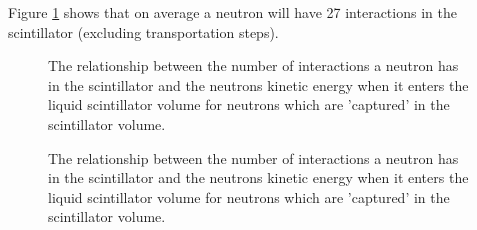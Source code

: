 \par
Figure \ref{fig:dd_neutron_gdls_kinetic_energy_vs_number_of_interactions} shows that on average a neutron will have 27 interactions in the scintillator (excluding transportation steps).


\begin{figure}[!htbp]%
\centering
{}
\caption{The relationship between the number of interactions a neutron has in the scintillator and the neutrons kinetic energy when it enters the liquid scintillator volume for neutrons which are 'captured' in the scintillator volume.
}
\label{fig:dd_neutron_gdls_kinetic_energy_vs_number_of_interactions}
\end{figure}


\begin{figure}[!htbp]%
\centering
{}
\caption{The relationship between the number of interactions a neutron has in the scintillator and the neutrons kinetic energy when it enters the liquid scintillator volume for neutrons which are 'captured' in the scintillator volume.
}
\label{fig:dd_neutron_gdls_distance_vs_number_of_interactions}
\end{figure}



